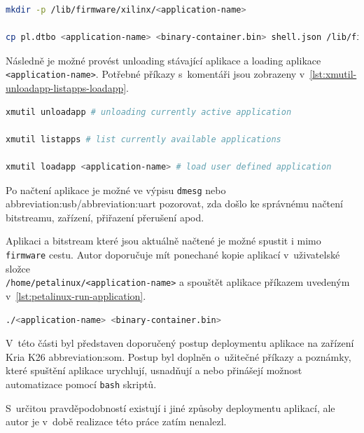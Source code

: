\documentclass[a4paper, twoside, 11pt]{article}
\begin{document}
	\begin{lstlisting}[language={sh}, caption={Příkaz vytvoření potřebné složky aplikace a kopírování potřebných souborů firmwaru.}, label={lst:cp-application-to-firmware}, morekeywords={mkdir, cp}]
mkdir -p /lib/firmware/xilinx/<application-name>

cp pl.dtbo <application-name> <binary-container.bin> shell.json /lib/firmware/xilinx/<application-name>\end{lstlisting}
	
	Následně je možné provést unloading stávající aplikace a loading aplikace \texttt{<application-name>}. Potřebné příkazy s~komentáři jsou zobrazeny v~\ref{lst:xmutil-unloadapp-listapps-loadapp}.\par

	\begin{lstlisting}[language={sh}, caption={Příkaz vytvoření složky aplikace a kopírování potřebných souborů firmwaru.}, label={lst:xmutil-unloadapp-listapps-loadapp}, morekeywords={xmutil}]
xmutil unloadapp # unloading currently active application

xmutil listapps # list currently available applications

xmutil loadapp <application-name> # load user defined application
\end{lstlisting}

Po načtení aplikace je možné ve výpisu \texttt{dmesg} nebo \gls{abbreviation:usb}/\gls{abbreviation:uart} pozorovat, zda došlo ke správnému načtení bitstreamu, zařízení, přiřazení přerušení apod.\par
Aplikaci a bitstream které jsou aktuálně načtené je možné spustit i mimo \texttt{firmware} cestu. Autor doporučuje mít ponechané kopie aplikací v~uživatelské složce\\\texttt{/home/petalinux/<application-name>} a spouštět aplikace příkazem uvedeným v~\ref{lst:petalinux-run-application}.\par


	\begin{lstlisting}[language={sh}, caption={Příkaz pro spuštění akcelerované aplikace.}, label={lst:petalinux-run-application}]
./<application-name> <binary-container.bin>\end{lstlisting}

	V~této části byl představen doporučený postup deploymentu aplikace na zařízení Kria K26 \gls{abbreviation:som}. Postup byl doplněn o~užitečné příkazy a poznámky, které spuštění aplikace urychlují, usnadňují a nebo přinášejí možnost automatizace pomocí \texttt{bash} skriptů.\par
	S~určitou pravděpodobností existují i jiné způsoby deploymentu aplikací, ale autor je v~době realizace této práce zatím nenalezl.
\end{document}

